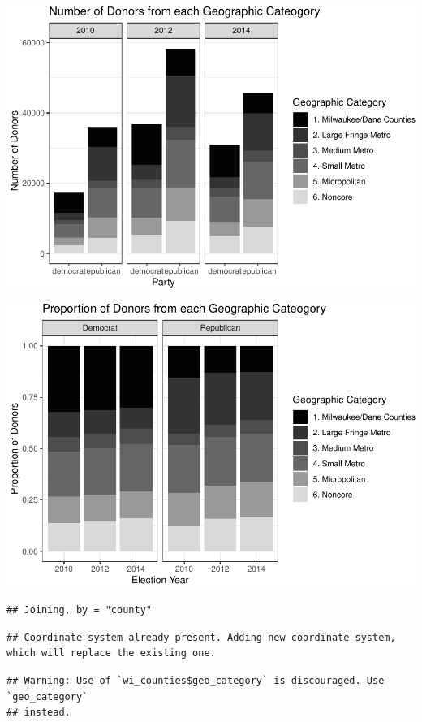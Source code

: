 \documentclass[10pt,]{article}
\begin{document}
\includegraphics{nchs_scratch_files/figure-latex/unnamed-chunk-5-1.pdf}

\includegraphics{nchs_scratch_files/figure-latex/unnamed-chunk-6-1.pdf}

\begin{verbatim}
## Joining, by = "county"
\end{verbatim}

\begin{verbatim}
## Coordinate system already present. Adding new coordinate system, which will replace the existing one.
\end{verbatim}

\begin{verbatim}
## Warning: Use of `wi_counties$geo_category` is discouraged. Use `geo_category`
## instead.
\end{verbatim}
\end{document}

